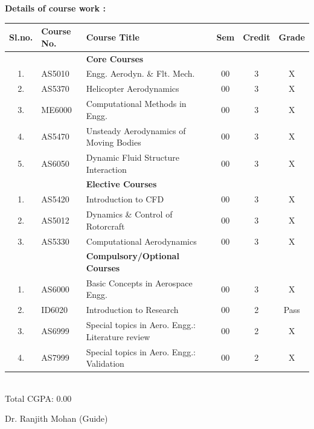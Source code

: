 \documentclass[11pt]{article}
\begin{document}
\newpage
\noindent\textbf{Details of course work :}
\begin{table}[h]
\centering
	\begin{tabular}{|c|l|l|c|c|c|}
		\hline
		\textbf{Sl.no.} & \textbf{Course No.} & \textbf{Course Title} & \textbf{Sem} & \textbf{Credit} & \textbf{Grade} \\ \hline
   &        & \textbf{Core Courses}             &    &         &       \\ \hline   
1. & AS5010 & Engg. Aerodyn. \& Flt. Mech.      & 00 & 3       & X     \\ \hline
2. & AS5370 & Helicopter Aerodynamics           & 00 & 3       & X     \\ \hline
3. & ME6000 & Computational Methods in Engg.    & 00 & 3       & X     \\ \hline
4. & AS5470 & Unsteady Aerodynamics of Moving Bodies & 00 & 3 & X      \\ \hline
5. & AS6050 & Dynamic Fluid Structure Interaction & 00 & 3     & X     \\ \hline \hline
   &        & \textbf{Elective Courses}         &    &         &       \\ \hline   
1. & AS5420 & Introduction to CFD               & 00 & 3       & X     \\ \hline
2. & AS5012 & Dynamics \& Control of Rotorcraft & 00 & 3       & X     \\ \hline
3. & AS5330 & Computational Aerodynamics        & 00 & 3       & X     \\ \hline \hline
   &        & \textbf{Compulsory/Optional Courses}   &    &    &       \\ \hline   
1. & AS6000 & Basic Concepts in Aerospace Engg. & 00 & 3       & X     \\ \hline
2. & ID6020 & Introduction to Research          & 00 & 2      & Pass   \\ \hline
3. & AS6999 & Special topics in Aero. Engg.: Literature review          & 00 & 2      & X \\ \hline
4. & AS7999 & Special topics in Aero. Engg.: Validation & 00 & 2      & X \\ \hline
	\end{tabular}
\end{table}\\
Total CGPA: 0.00

\vspace{2.5cm}
Dr. Ranjith Mohan (Guide)\\

\newpage
\end{document}
